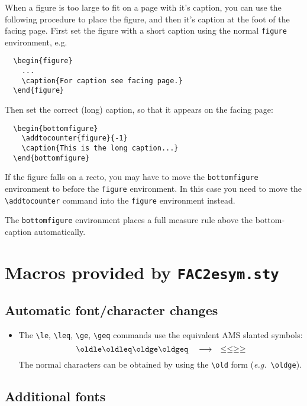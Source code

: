 \documentclass{fac}
\newcommand\eg{\textit{e.g.\ }}
\newcommand\lra{\ensuremath{\quad\longrightarrow\quad}}
\begin{document}
When a figure is too large to fit on a page with it's caption, you can use
the following procedure to place the figure, and then it's caption at the foot
of the facing page. First set the figure with a short caption
using the normal \verb"figure" environment, e.g.
\begin{verbatim}
  \begin{figure}
    ...
    \caption{For caption see facing page.}
  \end{figure}
\end{verbatim}
Then set the correct (long) caption, so that it appears on the facing page:
\begin{verbatim}
  \begin{bottomfigure}
    \addtocounter{figure}{-1}
    \caption{This is the long caption...}
  \end{bottomfigure}
\end{verbatim}
If the figure falls on a recto, you may have to move the \verb"bottomfigure"
environment to before the \verb"figure" environment. In this case you need to
move the \verb"\addtocounter" command into the \verb"figure" environment
instead.

The \verb"bottomfigure" environment places a full measure rule above the
bottom-caption automatically.

\section{Macros provided by \texttt{FAC2esym.sty}}

\subsection{Automatic font/character changes}

\begin{itemize}\itemsep=6pt
\item The \verb|\le|, \verb|\leq|, \verb|\ge|, \verb|\geq| commands
use the equivalent AMS slanted symbols:
\[
\oldle \oldleq \oldge \oldgeq
 \lra
\le \leq \ge \geq
\]
The normal characters can be obtained by using the \verb|\old| form
(\eg \verb|\oldge|).
\end{itemize}

\subsection{Additional fonts}
\end{document}

